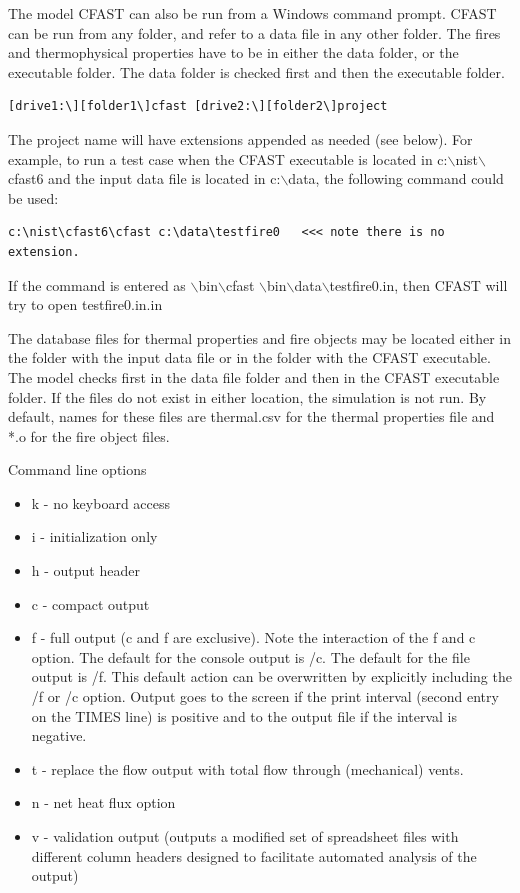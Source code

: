 The model CFAST can also be run from a Windows command prompt.  CFAST can be run from any folder, and refer to a data file in any other folder. The fires and thermophysical properties have to be in either the data folder, or the executable folder. The data folder is checked first and then the executable folder.

\begin{lstlisting}
[drive1:\][folder1\]cfast [drive2:\][folder2\]project
\end{lstlisting}

The project name will have extensions appended as needed (see below). For example, to run a test case when the CFAST executable is located in c:$\backslash$nist$\backslash$cfast6 and the input data file is located in c:$\backslash$data, the following command could be used:

\begin{lstlisting}
c:\nist\cfast6\cfast c:\data\testfire0   <<< note there is no extension.
\end{lstlisting}

If the command is entered as $\backslash$bin$\backslash$cfast $\backslash$bin$\backslash$data$\backslash$testfire0.in, then CFAST will try to open testfire0.in.in

The database files for thermal properties and fire objects may be located either in the folder with the input data file or in the folder with the CFAST executable. The model checks first in the data file folder and then in the CFAST executable folder.  If the files do not exist in either location, the simulation is not run. By default, names for these files are thermal.csv for the thermal properties file and *.o for the fire object files.

Command line options

\begin{itemize}
\item k - no keyboard access
\item i - initialization only
\item h - output header
\item c - compact output
\item f - full output (c and f are exclusive). Note the interaction of the f and c option. The default for the console output is /c. The default for the file output is /f. This default action can be overwritten by explicitly including the /f or /c option. Output goes to the screen if the print interval (second entry on the TIMES line) is positive and to the output file if the interval is negative.
\item t - replace the flow output with total flow through (mechanical) vents.
\item n - net heat flux option
\item v - validation output (outputs a modified set of spreadsheet files with different column headers designed to facilitate automated analysis of the output)
\end{itemize}
